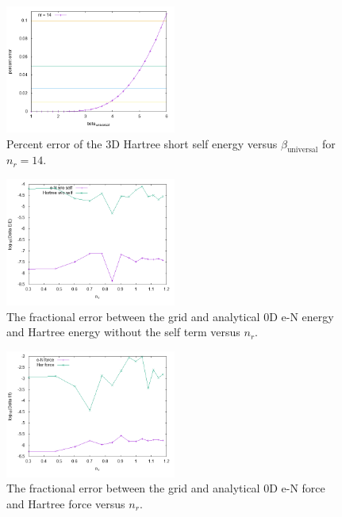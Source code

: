 \documentclass[paper=a4, fontsize=11pt]{article} %
\numberwithin{equation}{section} %
\numberwithin{figure}{section} %
\numberwithin{table}{section} %
\begin{document}
\begin{figure}[h!] 
    \centering
    \includegraphics[width=0.5\textwidth]{error3D}
    \caption{Percent error of the 3D Hartree short self energy versus $\beta_{\mathrm{universal}}$ for $n_r = 14$.} 
    \label{fig:error3D}
\end{figure}

\begin{figure}[h!] 
    \centering
    \includegraphics[width=0.5\textwidth]{conv}
    \caption{The fractional error between the grid and analytical 0D e-N energy and Hartree energy without the self term versus $n_r$.} 
    \label{fig:conv0D}
\end{figure}

\begin{figure}[h!] 
    \centering
    \includegraphics[width=0.5\textwidth]{fconv}
    \caption{The fractional error between the grid and analytical 0D e-N force and Hartree force versus $n_r$.} 
    \label{fig:fconv0D}
\end{figure}
\end{document}
